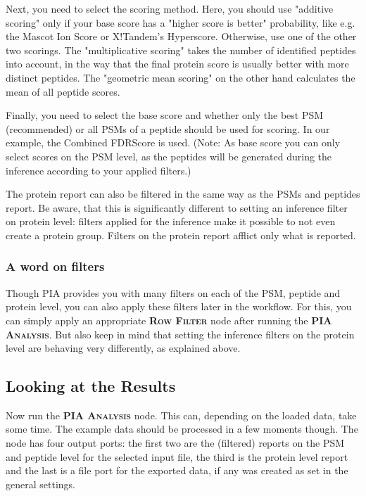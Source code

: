 \documentclass[a4paper,11pt,twoside]{article}
\newcommand{\knimenode}[1]{{\scshape\bfseries #1}}
\begin{document}
Next, you need to select the scoring method. Here, you should use "additive
scoring" only if your base score has a "higher score is better" probability,
like e.g. the Mascot Ion Score or X!Tandem's Hyperscore. Otherwise, use one of
the other two scorings. The "multiplicative scoring" takes the number of
identified peptides into account, in the way that the final protein score is
usually better with more distinct peptides. The "geometric mean scoring" on the
other hand calculates the mean of all peptide scores.

Finally, you need to select the base score and whether only the best PSM
(recommended) or all PSMs of a peptide should be used for scoring. In our
example, the Combined FDRScore is used. (Note: As base score you can only
select scores on the PSM level, as the peptides will be generated during the
inference according to your applied filters.)

The protein report can also be filtered in the same way as the PSMs and
peptides report. Be aware, that this is significantly different to setting an
inference filter on protein level: filters applied for the inference make it
possible to not even create a protein group. Filters on the protein report
afflict only what is reported.


\subsubsection{A word on filters}

Though PIA provides you with many filters on each of the PSM, peptide and
protein level, you can also apply these filters later in the workflow. For
this, you can simply apply an appropriate \knimenode{Row Filter} node after
running the \knimenode{PIA Analysis}. But also keep in mind that setting the
inference filters on the protein level are behaving very differently, as
explained above.


\subsection{Looking at the Results}

Now run the \knimenode{PIA Analysis} node. This can, depending on the loaded
data, take some time. The example data should be processed in a few moments
though. The node has four output ports: the first two are the (filtered)
reports on the PSM and peptide level for the selected input file, the third is
the protein level report and the last is a file port for the exported data, if
any was created as set in the general settings.
\end{document}
